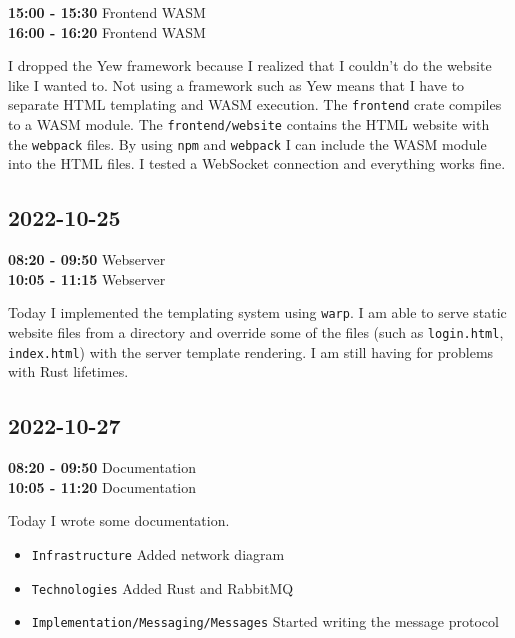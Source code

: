 \documentclass{article}
\begin{document}
\textbf{15:00 - 15:30} Frontend WASM \\
\textbf{16:00 - 16:20} Frontend WASM

I dropped the Yew framework because I realized that I couldn't do the website 
like I wanted to. Not using a framework such as Yew means that I have to separate
HTML templating and WASM execution. The \texttt{frontend} crate compiles to a WASM module.
The \texttt{frontend/website} contains the HTML website with the \texttt{webpack} files.
By using \texttt{npm} and \texttt{webpack} I can include the WASM module into the HTML files.
I tested a WebSocket connection and everything works fine.

\subsection{2022-10-25}

\textbf{08:20 - 09:50} Webserver \\
\textbf{10:05 - 11:15} Webserver

Today I implemented the templating system using \texttt{warp}.
I am able to serve static website files from a directory and override
some of the files (such as \texttt{login.html}, \texttt{index.html}) with
the server template rendering. I am still having for problems with Rust lifetimes.

\subsection{2022-10-27}

\textbf{08:20 - 09:50} Documentation \\
\textbf{10:05 - 11:20} Documentation

Today I wrote some documentation.
\begin{itemize}
    \item \texttt{Infrastructure} Added network diagram
    \item \texttt{Technologies} Added Rust and RabbitMQ
    \item \texttt{Implementation/Messaging/Messages} Started writing the message protocol
\end{itemize}
\end{document}

